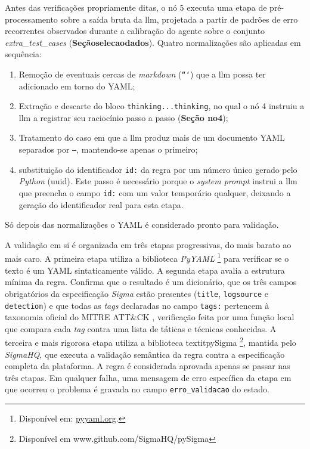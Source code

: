 Antes das verificações propriamente ditas, o nó 5 executa uma etapa de pré-processamento sobre a saída bruta da \gls{llm}, projetada a partir de padrões de erro recorrentes observados durante a calibração do agente sobre o conjunto \textit{extra\_test\_cases} (\textbf{Seçãoselecaodados}).
Quatro normalizações são aplicadas em sequência: 
\begin{enumerate}
	\item Remoção de eventuais cercas de \textit{markdown} (\texttt{```}) que a \gls{llm} possa ter adicionado em torno do YAML;
	
	\item Extração e descarte do bloco \texttt{\<thinking\>...\<\/thinking\>}, no qual o nó 4 instruiu a \gls{llm} a registrar seu raciocínio passo a passo (\textbf{Seção no4});
	
	\item Tratamento do caso em que a \gls{llm} produz mais de um documento YAML separados por \texttt{---}, mantendo-se apenas o primeiro;
	
	\item substituição do identificador \texttt{id:} da regra por um número único gerado pelo \textit{Python} (\gls{uuid}). Este passo é necessário porque o \textit{system prompt} instrui a \gls{llm} que preencha o campo \texttt{id:} com um valor temporário qualquer, deixando a geração do identificador real para esta etapa. 
\end{enumerate}
Só depois das normalizações o YAML é considerado pronto para validação.

A validação em si é organizada em três etapas progressivas, do mais barato ao mais caro. 
A primeira etapa utiliza a biblioteca \textit{PyYAML}
\footnote{Disponível em: \url{pyyaml.org}.} 
para verificar se o texto é um YAML sintaticamente válido. 
A segunda etapa avalia a estrutura mínima da regra. 
Confirma que o resultado é um dicionário, que os três campos obrigatórios da especificação \textit{Sigma} estão presentes (\texttt{title}, \texttt{logsource} e \texttt{detection}) e que todas as \textit{tags} declaradas no campo \texttt{tags:} pertencem à taxonomia oficial do MITRE ATT\&CK \cite{strom2018mitre}, verificação feita por uma função local que compara cada \textit{tag} contra uma lista de táticas e técnicas conhecidas. 
A terceira e mais rigorosa etapa utiliza a biblioteca textit{pySigma}
\footnote{Disponível em www.github.com/SigmaHQ/pySigma}, mantida pelo \textit{SigmaHQ}, que executa a validação semântica da regra contra a especificação completa da plataforma. 
A regra é considerada aprovada apenas se passar nas três etapas. 
Em qualquer falha, uma mensagem de erro específica da etapa em que ocorreu o problema é gravada no campo \texttt{erro\_validacao} do estado.

